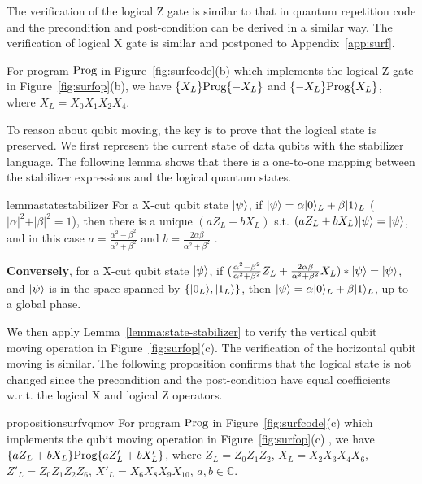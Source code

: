 The verification of the logical Z gate is similar to that in quantum repetition code and the precondition and post-condition 
can be derived in a similar way.  The verification of logical X gate is similar and postponed to Appendix~\ref{app:surf}.
\nothmskip
\begin{proposition}
	For program $\text{Prog}$ in Figure~\ref{fig:surfcode}(b) which implements the logical Z gate in Figure~\ref{fig:surfop}(b), we have $\{X_L\}\text{Prog}\{-X_L\}$ and $\{-X_L\}\text{Prog}\{X_L\}$, \\
	where $X_L = X_0X_1X_2X_4$.
\end{proposition} \nothmskip




To reason about qubit moving, the key is to prove that the logical state is preserved. 
We first represent the current state of data qubits with the stabilizer language. The following lemma shows that there is a one-to-one mapping between the stabilizer expressions and the logical  quantum states. %
\nothmskip
\begin{restatable}{lemma}{statestabilizer}
\label{lemma:state-stabilizer}
For a X-cut qubit state $\vert \psi \rangle$, if $\vert \psi \rangle = \alpha \vert 0 \rangle_L + \beta \vert 1 \rangle_L$ ($\vert\alpha\vert^2 + \vert\beta\vert^2 = 1$), then there is a unique $(a Z_L + b X_L)$ s.t. $(a Z_L + b X_L)\vert \psi \rangle = \vert \psi \rangle$, and in this case $a = \frac{\alpha^2 - \beta^2}{\alpha^2 + \beta^2}$ and $b = \frac{2\alpha\beta}{\alpha^2 + \beta^2}$ .

\noindent\textbf{Conversely}, for a X-cut qubit state $\vert \psi \rangle$, if $(\frac{\alpha^2 - \beta^2}{\alpha^2 + \beta^2} Z_L + \frac{2\alpha\beta}{\alpha^2 + \beta^2} X_L)\\ *\vert \psi \rangle = \vert \psi \rangle$, and $\vert \psi \rangle$ is in the space spanned by $\{\vert 0_L \rangle, \vert 1_L \rangle\}$, then $\vert \psi \rangle = \alpha \vert 0 \rangle_L + \beta \vert 1 \rangle_L$, up to a global phase.
\end{restatable} \nothmskip
We then apply Lemma~\ref{lemma:state-stabilizer} to verify the vertical qubit moving operation in Figure~\ref{fig:surfop}(c). The verification of the horizontal qubit moving is similar. The following proposition confirms that the logical state is not changed since the precondition and the post-condition have equal coefficients w.r.t. the logical X and logical Z operators. 
\nothmskip
\begin{restatable}{proposition}{surfvqmov}
For program $\text{Prog}$ in Figure~\ref{fig:surfcode}(c) which implements the qubit moving operation in Figure~\ref{fig:surfop}(c) %
, we have 
$\{a Z_L + b X_L\}\text{Prog}\{a Z'_L + b X'_L\}$, 
where $Z_L = Z_0Z_1Z_2$, $X_L = X_{2}X_{3}X_{4}X_{6}$, $Z'_L = Z_{0}Z_{1}Z_{2}Z_{6}$, $X'_L = X_{6}X_{8}X_{9}X_{10}$, $a,b \in \mathbb{C}$.
\end{restatable} \nothmskip



